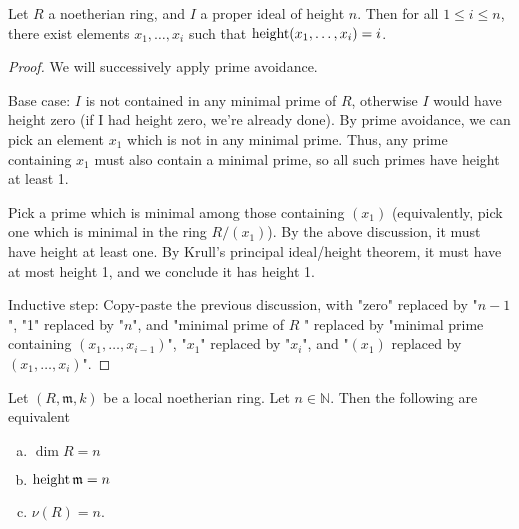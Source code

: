 \begin{theorem}
    \label{thm:genset_of_any_height_of_noetherian_height_n}
    Let \(R\) a noetherian ring, and \(I\) a proper 
    ideal of height \(n\).
    Then for all \(1 \leq i \leq n\),
    there exist elements \(x_{1}, \ldots, x_{i}\)
    such that
    \(\operatorname{height} (x_{1}, \ldots, x_{i}) = i\).
\end{theorem}

\begin{proof}
    We will successively apply prime avoidance.

    Base case: 
    \(I\) is not contained in any minimal prime of \(R\),
    otherwise \(I\) would have height zero (if I had height
    zero, we're already done).
    By prime avoidance, we can pick an element \(x_{1}\) which is
    not in any minimal prime. 
    Thus, any prime containing \(x_{1}\) must also contain a minimal prime, so
    all such primes have height at least 1.
    
    Pick a prime which is minimal among those containing \((x_{1})\)
    (equivalently, pick one which is minimal in the ring \(R / (x_{1})\)).
    By the above discussion, it must have height at least one. 
    By Krull's principal ideal/height theorem, it must have at most height 1,
    and we conclude it has height 1.

    Inductive step:
    Copy-paste the previous discussion, with "zero" replaced by "\(n-1\)",
    "1" replaced by "\(n\)", and "minimal prime of \(R\) " replaced by
    "minimal prime containing \((x_{1}, \ldots, x_{i-1})\)", 
    "\(x_{1}\)" replaced by "\(x_{i}\)", and
    "\((x_{1})\) replaced by \((x_{1}, \ldots, x_{i})\)".
   
\end{proof}


\begin{theorem}
    \label{thm:dimension_theorem}
    Let \((R,\mathfrak{m},k)\) be a local noetherian ring.
    Let \(n \in \mathbb{N}\).
    Then the following are equivalent
    \begin{enumerate}[(a)]
        \item \(\dim R = n\)
        \item \(\operatorname{height} \mathfrak{m} = n\)
        \item \(\nu(R) = n\).
    \end{enumerate}
\end{theorem}

